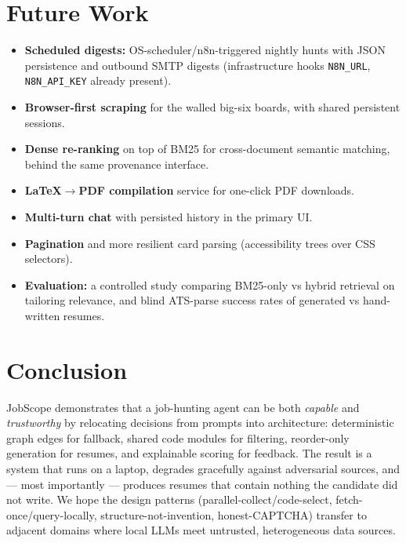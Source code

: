 \documentclass[11pt,a4paper]{article}
\newcommand{\code}[1]{\texttt{#1}}
\begin{document}
\section{Future Work}
\label{sec:future}

\begin{itemize}[leftmargin=2em]
  \item \textbf{Scheduled digests:} OS-scheduler/n8n-triggered nightly
        hunts with JSON persistence and outbound SMTP digests
        (infrastructure hooks \code{N8N\_URL}, \code{N8N\_API\_KEY}
        already present).
  \item \textbf{Browser-first scraping} for the walled big-six boards, with
        shared persistent sessions.
  \item \textbf{Dense re-ranking} on top of BM25 for cross-document
        semantic matching, behind the same provenance interface.
  \item \textbf{LaTeX$\rightarrow$PDF compilation} service for one-click
        PDF downloads.
  \item \textbf{Multi-turn chat} with persisted history in the primary UI.
  \item \textbf{Pagination} and more resilient card parsing (accessibility
        trees over CSS selectors).
  \item \textbf{Evaluation:} a controlled study comparing BM25-only vs
        hybrid retrieval on tailoring relevance, and blind ATS-parse
        success rates of generated vs hand-written resumes.
\end{itemize}

\section{Conclusion}
\label{sec:conclusion}

JobScope demonstrates that a job-hunting agent can be both \emph{capable}
and \emph{trustworthy} by relocating decisions from prompts into
architecture: deterministic graph edges for fallback, shared code modules
for filtering, reorder-only generation for resumes, and explainable scoring
for feedback. The result is a system that runs on a laptop, degrades
gracefully against adversarial sources, and --- most importantly ---
produces resumes that contain nothing the candidate did not write. We hope
the design patterns (parallel-collect/code-select, fetch-once/query-locally,
structure-not-invention, honest-CAPTCHA) transfer to adjacent domains where
local LLMs meet untrusted, heterogeneous data sources.
\end{document}
